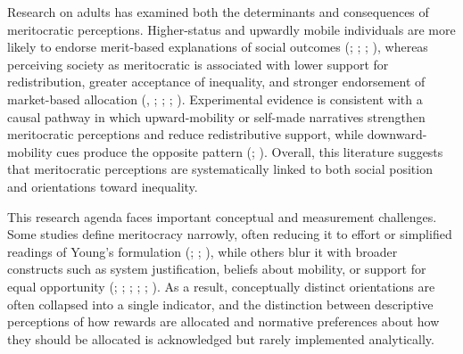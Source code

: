 \documentclass[
  13pt,
]{article}
\begin{document}
Research on adults has examined both the determinants and consequences
of meritocratic perceptions. Higher-status and upwardly mobile
individuals are more likely to endorse merit-based explanations of
social outcomes (;
; ;
), whereas
perceiving society as meritocratic is associated with lower support for
redistribution, greater acceptance of inequality, and stronger
endorsement of market-based allocation
(,
;
;
; ). Experimental evidence is consistent with a causal
pathway in which upward-mobility or self-made narratives strengthen
meritocratic perceptions and reduce redistributive support, while
downward-mobility cues produce the opposite pattern
(;
).
Overall, this literature suggests that meritocratic perceptions are
systematically linked to both social position and orientations toward
inequality.

This research agenda faces important conceptual and measurement
challenges. Some studies define meritocracy narrowly, often reducing it
to effort or simplified readings of Young's formulation
(;
;
), while others blur it with
broader constructs such as system justification, beliefs about mobility,
or support for equal opportunity
(;
;
;
;
;
). As a result,
conceptually distinct orientations are often collapsed into a single
indicator, and the distinction between descriptive perceptions of how
rewards are allocated and normative preferences about how they should be
allocated is acknowledged but rarely implemented analytically.
\end{document}
